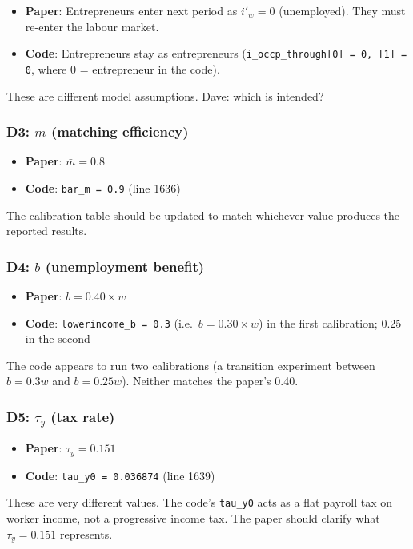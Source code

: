 \documentclass[11pt]{article}
\begin{document}
\begin{itemize}
    \item \textbf{Paper}: Entrepreneurs enter next period as $i'_w = 0$ (unemployed). They must re-enter the labour market.
    \item \textbf{Code}: Entrepreneurs stay as entrepreneurs (\texttt{i\_occp\_through[0] = 0, [1] = 0}, where 0 = entrepreneur in the code).
\end{itemize}
These are different model assumptions. Dave: which is intended?

\subsubsection*{D3: $\bar{m}$ (matching efficiency)}

\begin{itemize}
    \item \textbf{Paper}: $\bar{m} = 0.8$
    \item \textbf{Code}: \texttt{bar\_m = 0.9} (line 1636)
\end{itemize}
The calibration table should be updated to match whichever value produces the reported results.

\subsubsection*{D4: $b$ (unemployment benefit)}

\begin{itemize}
    \item \textbf{Paper}: $b = 0.40 \times w$
    \item \textbf{Code}: \texttt{lowerincome\_b = 0.3} (i.e.\ $b = 0.30 \times w$) in the first calibration; 0.25 in the second
\end{itemize}
The code appears to run two calibrations (a transition experiment between $b = 0.3w$ and $b = 0.25w$). Neither matches the paper's 0.40.

\subsubsection*{D5: $\tau_y$ (tax rate)}

\begin{itemize}
    \item \textbf{Paper}: $\tau_y = 0.151$
    \item \textbf{Code}: \texttt{tau\_y0 = 0.036874} (line 1639)
\end{itemize}
These are very different values. The code's \texttt{tau\_y0} acts as a flat payroll tax on worker income, not a progressive income tax. The paper should clarify what $\tau_y = 0.151$ represents.
\end{document}
